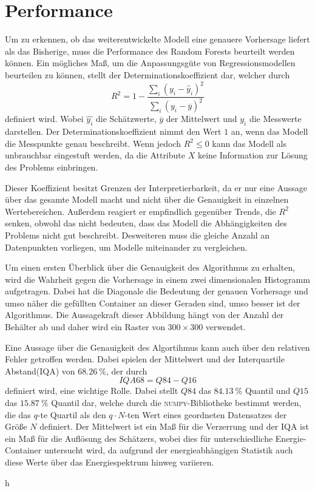 \section{Performance}

Um zu erkennen, ob das weiterentwickelte Modell eine genauere Vorhersage liefert als das Bisherige, muss die
Performance des Random Forests beurteilt werden können.
Ein mögliches Maß, um die Anpassungsgüte von Regressionsmodellen beurteilen zu können, stellt der Determinationskoeffizient dar, welcher
durch
\begin{equation}
  R^2 = 1 - \frac{\sum_i (y_i-\hat{y}_i)^2}{\sum_i (y_i - \overline{y})^2}
\end{equation}
definiert wird. Wobei $\hat{y_i}$ die Schätzwerte, $\overline{y}$ der Mittelwert und $y_i$ die Messwerte darstellen.
Der Determinationskoeffizient nimmt den Wert $1$ an, wenn das Modell die Messpunkte genau beschreibt. Wenn jedoch
$R^2 \leq 0$ kann das Modell als unbrauchbar eingestuft werden, da die Attribute $X$ keine Information zur
Lösung des Problems einbringen.

Dieser Koeffizient besitzt Grenzen der Interpretierbarkeit, da er nur eine Aussage über das gesamte Modell macht und
nicht über die Genauigkeit in einzelnen Wertebereichen.
Außerdem reagiert er empfindlich gegenüber Trends, die $R^2$ senken, obwohl das nicht bedeuten, dass das Modell die Abhängigkeiten des Problems
nicht gut beschreibt.
Desweiteren muss die gleiche Anzahl an Datenpunkten vorliegen, um Modelle
miteinander zu vergleichen.

Um einen ersten Überblick über die Genauigkeit des Algorithmus zu erhalten, wird die Wahrheit gegen die Vorhersage in einem
zwei dimensionalen Histogramm aufgetragen.
Dabei hat die Diagonale die Bedeutung der genauen Vorhersage und umso näher die gefüllten Container an dieser Geraden sind, umso besser
ist der Algorithmus.
Die Aussagekraft dieser Abbildung hängt von der Anzahl der Behälter ab und daher wird ein Raster von $300 \times 300$ verwendet.

Eine Aussage über die Genauigkeit des Algortihmus kann auch über den relativen Fehler getroffen werden. Dabei spielen der Mittelwert und der
Interquartile Abstand(IQA) von $\SI{68.26}{\percent}$, der durch
\begin{equation}
  IQA68 = Q84-Q16
\end{equation}
definiert wird, eine wichtige Rolle.
Dabei stellt $Q84$ das $\SI{84.13}{\percent}$ Quantil und $Q15$ das $\SI{15.87}{\percent}$ Quantil dar, welche durch die \textsc{numpy}-Bibliotheke
bestimmt werden, die das $q$-te Quartil als den $q \cdot N$-ten Wert eines geordneten Datensatzes der Größe $N$ definiert.
Der Mittelwert ist ein Maß für die Verzerrung und der IQA ist ein Maß für die Auflösung des Schätzers, wobei dies für unterschiedliche
Energie-Container untersucht wird, da aufgrund der energieabhängigen Statistik auch diese Werte über das Energiespektrum hinweg variieren.







h
